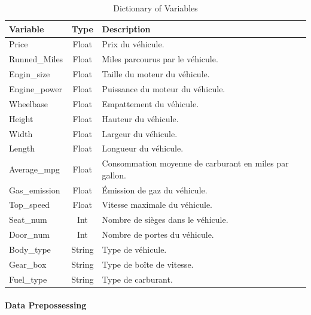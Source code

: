 \documentclass[12pt]{article}
\begin{document}
\begin{table}[ht]
    \centering
    \caption{Dictionary of Variables}
    \label{tab:variables}
    \begin{tabularx}{\textwidth}{lclX}
        \toprule
        \textbf{Variable} & \textbf{Type} & \textbf{Description} \\
        \midrule
        Price & Float & Prix du véhicule. \\
        Runned\_Miles & Float & Miles parcourus par le véhicule. \\
        Engin\_size & Float & Taille du moteur du véhicule. \\
        Engine\_power & Float & Puissance du moteur du véhicule. \\
        Wheelbase & Float & Empattement du véhicule. \\
        Height & Float & Hauteur du véhicule. \\
        Width & Float & Largeur du véhicule. \\
        Length & Float & Longueur du véhicule. \\
        Average\_mpg & Float & Consommation moyenne de carburant en miles par gallon. \\
        Gas\_emission & Float & Émission de gaz du véhicule. \\
        Top\_speed & Float & Vitesse maximale du véhicule. \\
        Seat\_num & Int & Nombre de sièges dans le véhicule. \\
        Door\_num & Int & Nombre de portes du véhicule. \\
        Body\_type & String & Type de véhicule. \\
        Gear\_box & String & Type de boîte de vitesse. \\
        Fuel\_type & String & Type de carburant. \\
        \bottomrule
    \end{tabularx}
\end{table}

\paragraph{Data Prepossessing}
~~\\
\end{document}
